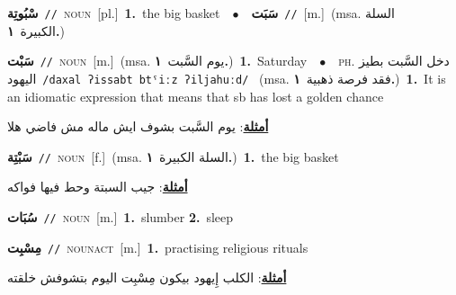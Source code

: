 \documentclass[10pt,a4paper,twoside]{article} %
\begin{document}
\begin{multicols}{2}
{{\setlength\topsep{0pt}\textbf{\foreignlanguage{arabic}{سْبُوتِة}}\ {\color{gray}\texttt{//}\color{black}}\ \textsc{noun}\ [pl.]\ \textbf{1.}~the big basket\ \ $\bullet$\ \ \setlength\topsep{0pt}\textbf{\foreignlanguage{arabic}{سَبَت}}\ {\color{gray}\texttt{//}\color{black}}\ [m.]\ \color{gray}(msa. \foreignlanguage{arabic}{السلة الكبيرة}~\foreignlanguage{arabic}{\textbf{١.}})\color{black}\ 

{\setlength\topsep{0pt}\textbf{\foreignlanguage{arabic}{سَبْت}}\ {\color{gray}\texttt{//}\color{black}}\ \textsc{noun}\ [m.]\ \color{gray}(msa. \foreignlanguage{arabic}{يوم السَّبت}~\foreignlanguage{arabic}{\textbf{١.}})\color{black}\ \textbf{1.}~Saturday\ \ $\bullet$\ \ \textsc{ph.} \color{gray} \foreignlanguage{arabic}{دخل السَّبت بطيز اليهود}\color{black}\ {\color{gray}\texttt{/{\sffamily daxal ʔissabt btˤiːz ʔiljahuːd}/}\color{black}}\ \color{gray} (msa. \foreignlanguage{arabic}{فقد فرصة ذهبية}~\foreignlanguage{arabic}{\textbf{١.}})\color{black}\ \textbf{1.}~It is an idiomatic expression that means that sb has lost a golden chance\  \begin{flushright}\color{gray}\foreignlanguage{arabic}{\textbf{\underline{\foreignlanguage{arabic}{أمثلة}}}: يوم السَّبت بشوف ايش ماله مش فاضي هلا}\end{flushright}\color{black}} \vspace{2mm}

{\setlength\topsep{0pt}\textbf{\foreignlanguage{arabic}{سَبْتِة}}\ {\color{gray}\texttt{//}\color{black}}\ \textsc{noun}\ [f.]\ \color{gray}(msa. \foreignlanguage{arabic}{السلة الكبيرة}~\foreignlanguage{arabic}{\textbf{١.}})\color{black}\ \textbf{1.}~the big basket\  \begin{flushright}\color{gray}\foreignlanguage{arabic}{\textbf{\underline{\foreignlanguage{arabic}{أمثلة}}}: جيب السبتة وحط فيها فواكه}\end{flushright}\color{black}} \vspace{2mm}

{\setlength\topsep{0pt}\textbf{\foreignlanguage{arabic}{سُبَات}}\ {\color{gray}\texttt{//}\color{black}}\ \textsc{noun}\ [m.]\ \textbf{1.}~slumber  \textbf{2.}~sleep\ 

{\setlength\topsep{0pt}\textbf{\foreignlanguage{arabic}{مِسْبِت}}\ {\color{gray}\texttt{//}\color{black}}\ \textsc{noun\textunderscore act}\ [m.]\ \textbf{1.}~practising religious rituals\  \begin{flushright}\color{gray}\foreignlanguage{arabic}{\textbf{\underline{\foreignlanguage{arabic}{أمثلة}}}: الكلب إِيهود بيكون مِسْبِت اليوم بتشوفش خلقته}\end{flushright}\color{black}} \vspace{2mm}

}}}
\end{multicols}
\end{document}
